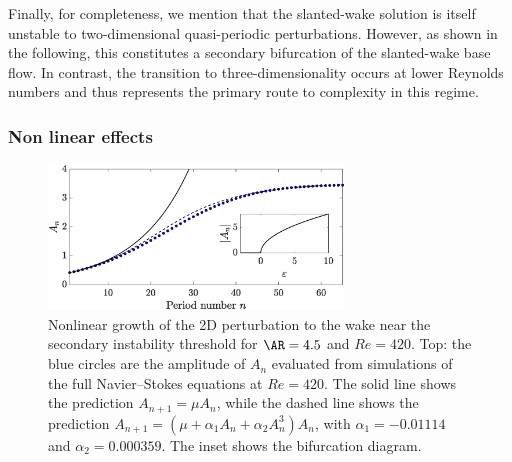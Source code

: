 Finally, for completeness, we mention that the slanted-wake solution is itself unstable to two-dimensional quasi-periodic perturbations. However, as shown in the following, this constitutes a secondary bifurcation of the slanted-wake base flow. In contrast, the transition to three-dimensionality occurs at lower Reynolds numbers and thus represents the primary route to complexity in this regime.

\subsubsection{Non linear effects}

\begin{figure}
  \centering
  \includegraphics[width=0.7\textwidth]{./fig/AR4p5/Nlgrowth_Re420.eps}
  \caption{Nonlinear growth of the 2D perturbation to the wake near the secondary instability threshold for $\AR=4.5$ and $Re=420$. Top: the blue circles are the amplitude of $A_n$ evaluated from simulations of the full Navier--Stokes equations at $Re=420$. The solid line shows the prediction $A_{n+1} = \mu A_n$, while the dashed line shows the prediction $A_{n+1} = ( \mu + \alpha_1 A_n + \alpha_2 A_n^3 ) A_n$, with $\alpha_1 = -0.01114$ and $\alpha_2 = 0.000359$. The inset shows the bifurcation diagram.}
  \label{fig:ar4p5_nnl}
\end{figure}

